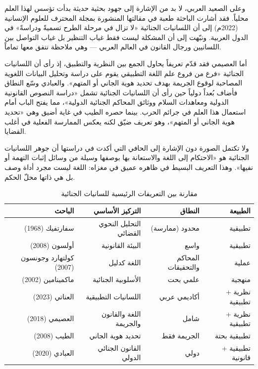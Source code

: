 وعلى الصعيد العربي، لا بد من الإشارة إلى جهود بحثية حديثة بدأت تؤسس لهذا العلم محلياً. فقد أشارت الباحثة طعبة في مقالتها المنشورة بمجلة المحترف للعلوم الإنسانية (2022م) إلى أن اللسانيات الجنائية «لا تزال في مرحلة الطرح تسميةً ودراسةً» في الدول العربية\autocite[60]{taaba2022}. ونبّهت إلى أن المشكلة ليست فقط غياب التنظير بل غياب التواصل بين اللسانيين ورجال القانون في العالم العربي — وهي ملاحظة نتفق معها تماماً.

أما العصيمي فقد قدّم تعريفاً يحاول الجمع بين النظرية والتطبيق، إذ رأى أن اللسانيات الجنائية «فرع من فروع علم اللغة التطبيقي يقوم على دراسة وتحليل البيانات اللغوية المصاحبة لوقوع الجريمة بهدف تحديد هوية الجاني أو المتهم»\autocite[25]{alassimi2018}. والعبادي وسّع النطاق فأضاف بُعداً دولياً حين رأى أن اللسانيات الجنائية تشمل «دراسة النصوص القانونية الدولية ومعاهدات السلام ووثائق المحاكم الجنائية الدولية»\autocite[90]{alabadi2020}، مما يفتح الباب أمام استعمال هذا العلم في جرائم الحرب. بينما حصره الطيب في غاية أضيق وهي «تحديد هوية الجاني أو المتهم»\autocite[267]{altayeb2008}، وهو تعريف ضيّق لكنه يعكس الممارسة الفعلية في أغلب القضايا.

ولا تكتمل الصورة دون الإشارة إلى الحافي التي أكدت في دراستها أن جوهر اللسانيات الجنائية هو «الاحتكام إلى اللغة والاستعانة بها بوصفها وسيلة من وسائل إثبات التهمة أو نفيها»\autocite[5]{alhafi2023}. وهذا التعريف البسيط في ظاهره عميق في مغزاه: اللغة ليست مجرد أداة وصف بل هي ذاتها محلّ الحكم.

\begin{table}[H]
\centering
\caption{مقارنة بين التعريفات الرئيسية للسانيات الجنائية}
\begin{tabular}{r r r r}
\toprule
\textbf{الباحث} & \textbf{التركيز الأساسي} & \textbf{النطاق} & \textbf{الطبيعة} \\
\midrule
سفارتفيك (1968) & التحليل النحوي القضائي & محدود (ممارسة) & تطبيقية \\
أولسون (2008) & البيئة القانونية & واسع & تطبيقية \\
كولتهارد وجونسون (2007) & اللغة كدليل & المحاكم والتحقيقات & عملية \\
ماكمينامين (2002) & الأسلوبية الجنائية & علمي بحت & منهجية \\
العناتي (2023) & اللسانيات التطبيقية & أكاديمي عربي & نظرية + تطبيقية \\
العصيمي (2018) & اللغة والقانون والجريمة & شامل & نظرية + تطبيقية \\
الطيب (2008) & تحديد هوية الجاني & الجريمة فقط & تطبيقية بحتة \\
العبادي (2020) & القانون الجنائي الدولي & دولي & تطبيقية + قانونية \\
\bottomrule
\end{tabular}
\end{table}

